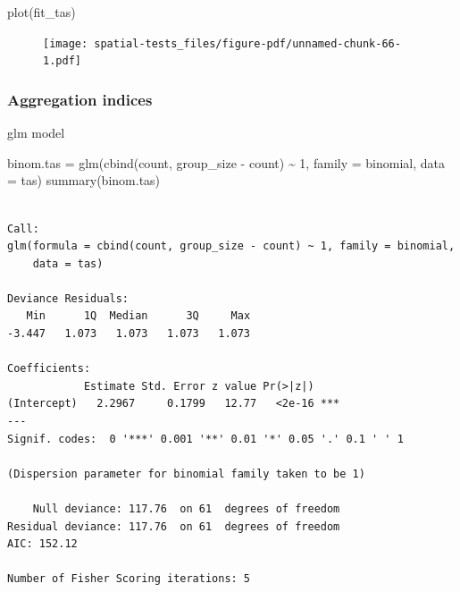 \documentclass[
  letterpaper,
]{book}
\newenvironment{Shaded}{\begin{snugshade}}{\end{snugshade}}
\newcommand{\AttributeTok}[1]{\textcolor[rgb]{0.40,0.45,0.13}{#1}}
\newcommand{\DecValTok}[1]{\textcolor[rgb]{0.68,0.00,0.00}{#1}}
\newcommand{\FunctionTok}[1]{\textcolor[rgb]{0.28,0.35,0.67}{#1}}
\newcommand{\NormalTok}[1]{\textcolor[rgb]{0.00,0.23,0.31}{#1}}
\newcommand{\OtherTok}[1]{\textcolor[rgb]{0.00,0.23,0.31}{#1}}
\newcommand{\SpecialCharTok}[1]{\textcolor[rgb]{0.37,0.37,0.37}{#1}}
\begin{document}
\begin{Shaded}
\begin{Highlighting}[]
\FunctionTok{plot}\NormalTok{(fit\_tas)}
\end{Highlighting}
\end{Shaded}

\begin{figure}[H]

{\centering \texttt{[image: spatial-tests\_files/figure-pdf/unnamed-chunk-66-1.pdf]}

}

\end{figure}

\hypertarget{aggregation-indices-1}{%
\subsubsection{Aggregation indices}\label{aggregation-indices-1}}

glm model

\begin{Shaded}
\begin{Highlighting}[]
\NormalTok{binom.tas }\OtherTok{=} \FunctionTok{glm}\NormalTok{(}\FunctionTok{cbind}\NormalTok{(count, group\_size }\SpecialCharTok{{-}}\NormalTok{ count) }\SpecialCharTok{\textasciitilde{}} \DecValTok{1}\NormalTok{,}
                \AttributeTok{family =}\NormalTok{ binomial,}
                \AttributeTok{data =}\NormalTok{ tas)}
\FunctionTok{summary}\NormalTok{(binom.tas)}
\end{Highlighting}
\end{Shaded}

\begin{verbatim}

Call:
glm(formula = cbind(count, group_size - count) ~ 1, family = binomial, 
    data = tas)

Deviance Residuals: 
   Min      1Q  Median      3Q     Max  
-3.447   1.073   1.073   1.073   1.073  

Coefficients:
            Estimate Std. Error z value Pr(>|z|)    
(Intercept)   2.2967     0.1799   12.77   <2e-16 ***
---
Signif. codes:  0 '***' 0.001 '**' 0.01 '*' 0.05 '.' 0.1 ' ' 1

(Dispersion parameter for binomial family taken to be 1)

    Null deviance: 117.76  on 61  degrees of freedom
Residual deviance: 117.76  on 61  degrees of freedom
AIC: 152.12

Number of Fisher Scoring iterations: 5
\end{verbatim}
\end{document}
